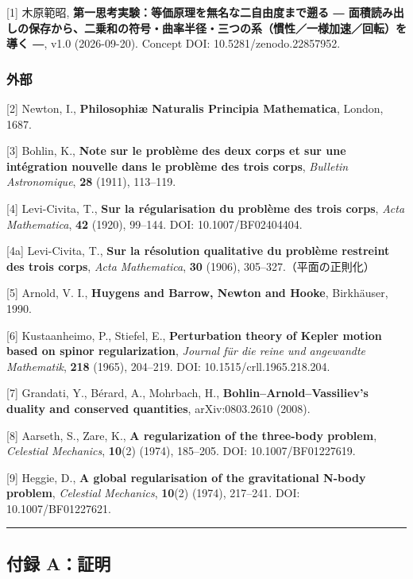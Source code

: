 \documentclass[
  a4paper,
]{ltjsarticle}
\begin{document}
{[}1{]} 木原範昭, \textbf{第一思考実験：等価原理を無名な二自由度まで遡る
―
面積読み出しの保存から、二乗和の符号・曲率半径・三つの系（慣性／一様加速／回転）を導く
―}, v1.0 (2026-09-20). Concept DOI: 10.5281/zenodo.22857952.

\subsubsection{外部}\label{ux5916ux90e8}

{[}2{]} Newton, I., \textbf{Philosophiæ Naturalis Principia
Mathematica}, London, 1687.

{[}3{]} Bohlin, K., \textbf{Note sur le problème des deux corps et sur
une intégration nouvelle dans le problème des trois corps},
\emph{Bulletin Astronomique}, \textbf{28} (1911), 113--119.

{[}4{]} Levi-Civita, T., \textbf{Sur la régularisation du problème des
trois corps}, \emph{Acta Mathematica}, \textbf{42} (1920), 99--144. DOI:
10.1007/BF02404404.

{[}4a{]} Levi-Civita, T., \textbf{Sur la résolution qualitative du
problème restreint des trois corps}, \emph{Acta Mathematica},
\textbf{30} (1906), 305--327.（平面の正則化）

{[}5{]} Arnold, V. I., \textbf{Huygens and Barrow, Newton and Hooke},
Birkhäuser, 1990.

{[}6{]} Kustaanheimo, P., Stiefel, E., \textbf{Perturbation theory of
Kepler motion based on spinor regularization}, \emph{Journal für die
reine und angewandte Mathematik}, \textbf{218} (1965), 204--219. DOI:
10.1515/crll.1965.218.204.

{[}7{]} Grandati, Y., Bérard, A., Mohrbach, H.,
\textbf{Bohlin--Arnold--Vassiliev's duality and conserved quantities},
arXiv:0803.2610 (2008).

{[}8{]} Aarseth, S., Zare, K., \textbf{A regularization of the
three-body problem}, \emph{Celestial Mechanics}, \textbf{10}(2) (1974),
185--205. DOI: 10.1007/BF01227619.

{[}9{]} Heggie, D., \textbf{A global regularisation of the gravitational
N-body problem}, \emph{Celestial Mechanics}, \textbf{10}(2) (1974),
217--241. DOI: 10.1007/BF01227621.

\begin{center}\rule{0.5\linewidth}{0.5pt}\end{center}

\subsection{付録 A：証明}\label{ux4ed8ux9332-aux8a3cux660e}
\end{document}
